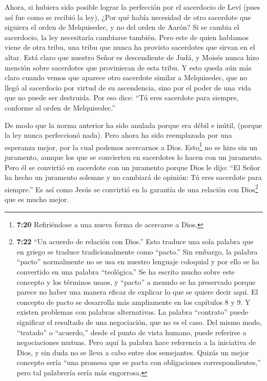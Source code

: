  Ahora, si hubiera sido posible lograr la perfección por el
sacerdocio de Leví (pues así fue como se recibió la ley), ¿Por qué había
necesidad de otro sacerdote que siguiera el orden de Melquisedec, y no
del orden de Aarón?  Si se cambia el sacerdocio, la ley
necesitaría cambiarse también.  Pero este de quien hablamos
viene de otra tribu, una tribu que nunca ha provisto sacerdotes que
sirvan en el altar.  Está claro que nuestro Señor es
descendiente de Judá, y Moisés nunca hizo mención sobre sacerdotes que
provinieran de esta tribu.  Y esto queda aún más claro
cuando vemos que aparece otro sacerdote similar a Melquisedec,
 que no llegó al sacerdocio por virtud de su ascendencia,
sino por el poder de una vida que no puede ser destruida. 
Por eso dice: ``Tú eres sacerdote para siempre, conforme al orden de
Melquisedec.''

 De modo que la norma anterior ha sido anulada porque era
débil e inútil,  (porque la ley nunca perfeccionó nada).
Pero ahora ha sido reemplazada por una esperanza mejor, por la cual
podemos acercarnos a Dios.  Esto\footnote{\textbf{7:20}
  Refiriéndose a una nueva forma de acercarse a Dios.} no se hizo sin un
juramento, aunque los que se convierten en sacerdotes lo hacen con un
juramento.  Pero él se convirtió en sacerdote con un
juramento porque Dios le dijo: ``El Señor ha hecho un juramento solemne
y no cambiará de opinión: Tú eres sacerdote para siempre.''
 Es así como Jesús se convirtió en la garantía de una
relación con Dios\footnote{\textbf{7:22} ``Un acuerdo de relación con
  Dios.'' Esto traduce una sola palabra que en griego se traduce
  tradicionalmente como ``pacto.'' Sin embargo, la palabra ``pacto''
  normalmente no se usa en nuestro lenguaje coloquial y por ello se ha
  convertido en una palabra ``teológica.'' Se ha escrito mucho sobre
  este concepto y los términos usaos, y ``pacto'' a menudo se ha
  preservado porque parece no haber una manera eficaz de explicar lo que
  se quiere decir aquí. El concepto de pacto se desarrolla más
  ampliamente en los capítulos 8 y 9. Y existen problemas con palabras
  alternativas. La palabra ``contrato'' puede significar el resultado de
  una negociación, que no es el caso. Del mismo modo, ``tratado'' o
  ``acuerdo,'' desde el punto de vista humano, puede referirse a
  negociaciones mutuas. Pero aquí la palabra hace referencia a la
  iniciativa de Dios, y sin duda no se lleva a cabo entre dos
  semejantes. Quizás un mejor concepto sería ``una promesa que se pacta
  con obligaciones correspondientes,'' pero tal palabrería sería más
  engorrosa.} que es mucho mejor.

